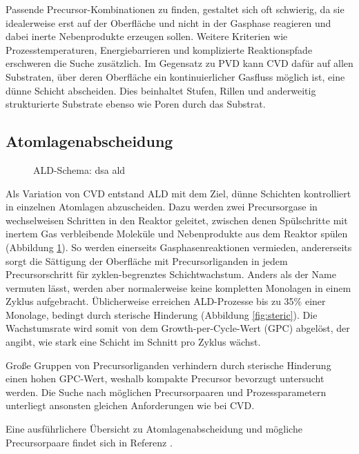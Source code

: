 Passende Precursor-Kombinationen zu finden, gestaltet sich oft schwierig, da sie idealerweise erst auf der Oberfläche und nicht in der Gasphase reagieren und dabei inerte Nebenprodukte erzeugen sollen.
Weitere Kriterien wie Prozesstemperaturen, Energiebarrieren und komplizierte Reaktionspfade erschweren die Suche zusätzlich.
Im Gegensatz zu PVD kann CVD dafür auf allen Substraten, über deren Oberfläche ein kontinuierlicher Gasfluss möglich ist, eine dünne Schicht abscheiden.
Dies beinhaltet Stufen, Rillen und anderweitig strukturierte Substrate ebenso wie Poren durch das Substrat.


\subsection{Atomlagenabscheidung}

\begin{figure}
  \centering
  \def\svgwidth{\textwidth}
  
  \caption[ALD-Schema]{ALD-Schema: dsa ald}
  \label{fig:ald-schema}
\end{figure}

Als Variation von CVD entstand ALD  mit dem Ziel, dünne Schichten kontrolliert in einzelnen Atomlagen abzuscheiden.
Dazu werden zwei Precursorgase in wechselweisen Schritten in den Reaktor geleitet, zwischen denen Spülschritte mit inertem Gas verbleibende Moleküle und Nebenprodukte aus dem Reaktor spülen (Abbildung \ref{fig:ald-schema}).
So werden einerseits Gasphasenreaktionen vermieden, andererseits sorgt die Sättigung  der Oberfläche mit Precursorliganden in jedem Precursorschritt für zyklen-begrenztes Schichtwachstum.
Anders als der Name vermuten lässt, werden aber normalerweise keine kompletten Monolagen in einem Zyklus aufgebracht.
Üblicherweise erreichen ALD-Prozesse bis zu 35\%  einer Monolage, bedingt durch sterische Hinderung (Abbildung \ref{fig:steric}).
Die Wachstumsrate wird somit von dem Growth-per-Cycle-Wert (GPC) abgelöst, der angibt, wie stark eine Schicht im Schnitt pro Zyklus wächst.

Große Gruppen von Precursorliganden verhindern durch sterische Hinderung einen hohen GPC-Wert, weshalb kompakte Precursor bevorzugt untersucht werden. 
Die Suche nach möglichen Precursorpaaren und Prozessparametern unterliegt ansonsten gleichen Anforderungen wie bei CVD.

Eine ausführlichere Übersicht zu Atomlagenabscheidung und mögliche Precursorpaare findet sich in Referenz \cite{puurunen_surface_2005}.

